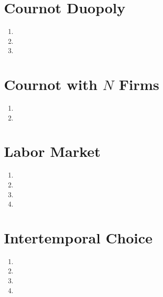 \documentclass{article}
\begin{document}
\section{Cournot Duopoly}

\begin{enumerate}
    \item
    \item
    \item
\end{enumerate}

\section{Cournot with $N$ Firms}

\begin{enumerate}
    \item
    \item
\end{enumerate}

\section{Labor Market}

\begin{enumerate}
    \item
    \item
    \item
    \item
\end{enumerate}

\section{Intertemporal Choice}

\begin{enumerate}
    \item
    \item
    \item
    \item
\end{enumerate}
\end{document}
